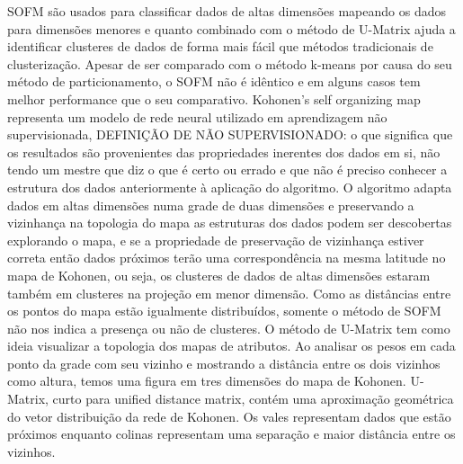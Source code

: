 \cite{ultsch1995self} SOFM são usados para classificar dados de altas dimensões mapeando os dados para dimensões menores e quanto combinado com o método de U-Matrix ajuda a identificar clusteres de dados de forma mais fácil que métodos tradicionais de clusterização. Apesar de ser comparado com o método k-means por causa do seu método de particionamento, o SOFM não é idêntico e em alguns casos tem melhor performance que o seu comparativo. Kohonen's self organizing map representa um modelo de rede neural utilizado em aprendizagem não supervisionada, DEFINIÇÃO DE NÃO SUPERVISIONADO: o que significa que os resultados são provenientes das propriedades inerentes dos dados em si, não tendo um mestre que diz o que é certo ou errado e que não é preciso conhecer a estrutura dos dados anteriormente à aplicação do algoritmo. O algoritmo adapta dados em altas dimensões numa grade de duas dimensões e preservando a vizinhança na topologia do mapa as estruturas dos dados podem ser descobertas explorando o mapa, e se a propriedade de preservação de vizinhança estiver correta então dados próximos terão uma correspondência na mesma latitude no mapa de Kohonen, ou seja, os clusteres de dados de altas dimensões estaram também em clusteres na projeção em menor dimensão. Como as distâncias entre os pontos do mapa estão igualmente distribuídos, somente o método de SOFM não nos indica a presença ou não de clusteres. O método de U-Matrix tem como ideia visualizar a topologia dos mapas de atributos. Ao analisar os pesos em cada ponto da grade com seu vizinho e mostrando a distância entre os dois vizinhos como altura, temos uma figura em tres dimensões do mapa de Kohonen. U-Matrix, curto para unified distance matrix, contém uma aproximação geométrica do vetor distribuição da rede de Kohonen. Os vales representam dados que estão próximos enquanto colinas representam uma separação e maior distância entre os vizinhos.

